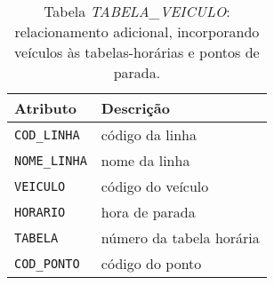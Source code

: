 \begin{table}[htb]
    \caption{Tabela \emph{TABELA\_VEICULO}: relacionamento adicional, incorporando veículos às tabelas-horárias e pontos de parada.}
    \centering
    \begin{tabular}{ p{5cm}p{9cm}} 
        \hline
        Atributo & Descrição\\
        \hline
        \texttt{COD\_LINHA}  & código da linha \\
        \texttt{NOME\_LINHA} & nome da linha \\
        \texttt{VEICULO}     & código do veículo \\
        \texttt{HORARIO}     & hora de parada \\
        \texttt{TABELA}      & número da tabela horária  \\
        \texttt{COD\_PONTO}  & código do ponto \\
        \hline 
    \end{tabular}
    \label{tab:tabela_veiculo}
\end{table}

